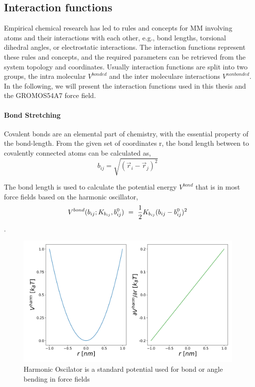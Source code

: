 \subsection{Interaction functions}
Empirical chemical research has led to rules and concepts for MM involving atoms and their interactions with each other, e.g., bond lengths, torsional dihedral angles, or electrostatic interactions.\cite{Morse1929, Pauling1934, } 
The interaction functions represent these rules and concepts, and the required parameters can be retrieved from the system topology and coordinates. 
Usually interaction functions are split into two groups, the intra molecular $V^{bonded}$ and the inter moleculare interactions $V^{nonbonded} $. \cite{}
In the following, we will present the interaction functions used in this thesis and the GROMOS54A7 force field\cite{Schmid2011}. 

\paragraph{Bond Stretching}
Covalent bonds are an elemental part of chemistry, with the essential property of the bond-length. From the given set of coordinates r, the bond length between to covalently connected atoms can be calculated as,
\begin{equation}
    b_{ij} = \sqrt{(\vec{r}_i-\vec{r}_j)^{2}}
\end{equation}

The bond length is used to calculate the potential energy $V^{bond}$ that is in most force fields based on the harmonic oscillator, \cite{}
\begin{equation}
    V^{bond}(b_{ij}; K_{b_{ij}}, b_{ij}^0)~=~\frac{1}{2} K_{b_{ij}} (b_{ij}-b^0_{ij})^2 \\
\end{equation}.

\begin{figure}[h]
    \centering
    \includegraphics[width=\textwidth]{fig/ForceField/harm_osc.png}
    \caption{Harmonic Oscilator is a standard potential used for bond or angle bending in force fields}
    \label{fig:harmOsc}
\end{figure}

